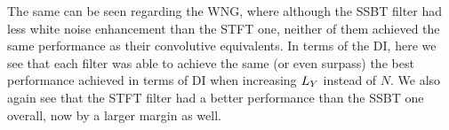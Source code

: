 The same can be seen regarding the WNG, where although the SSBT filter had less white noise enhancement than the STFT one, neither of them achieved the same performance as their convolutive equivalents. In terms of the DI, here we see that each filter was able to achieve the same (or even surpass) the best performance achieved in terms of DI when increasing $\Ly$ instead of $N$. We also again see that the STFT filter had a better performance than the SSBT one overall, now by a larger margin as well.
%
%
